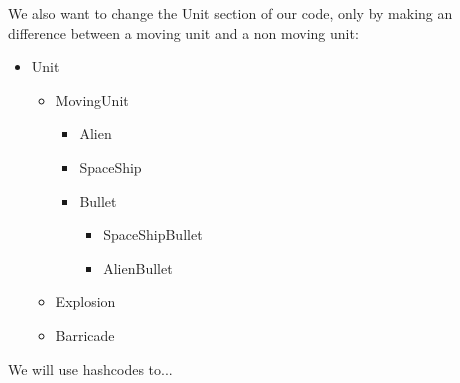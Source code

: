 \documentclass[10pt]{article}
\begin{document}
We also want to change the Unit section of our code, only by making an difference between a moving unit and a non moving unit:
\begin{itemize}
\item Unit
\begin{itemize}
\item MovingUnit
\begin{itemize}
\item Alien
\item SpaceShip
\item Bullet
\begin{itemize}
\item SpaceShipBullet
\item AlienBullet
\end{itemize}
\end{itemize}
\item Explosion
\item Barricade
\end{itemize}
\end{itemize}
	
We will use hashcodes to...
\end{document}
